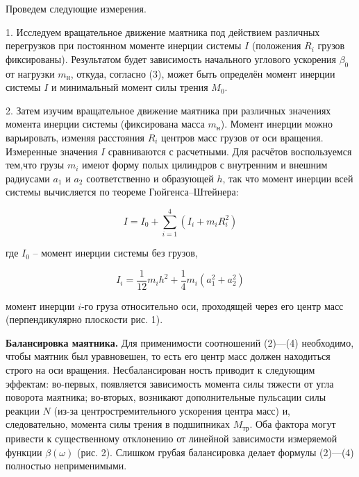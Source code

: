 \documentclass[14pt]{article}
\begin{document}
\vspace{1cm}
Проведем следующие измерения.

\vspace{0.5cm}
1. Исследуем вращательное движение маятника под действием различных перегрузков при постоянном моменте инерции системы $I$ (положения $R_i$ грузов фиксированы). Результатом будет зависимость начального углового ускорения $\beta_0$ от нагрузки $m_\text{н}$, откуда, согласно
(3), может быть определён момент инерции системы $I$ и минимальный момент силы трения $M_0$.

2. Затем изучим вращательное движение маятника при различных значениях момента инерции системы (фиксирована масса $m_\text{н}$). Момент инерции можно варьировать, изменяя расстояния $R_i$ центров масс грузов от оси вращения. Измеренные значения $I$ сравниваются с расчетными. Для расчётов воспользуемся тем,что грузы $m_i$ имеют форму полых цилиндров с внутренним и внешним радиусами $a_1$ и $a_2$ соответственно и образующей $h$, так что момент инерции всей системы вычисляется по теореме Гюйгенса–Штейнера:

\begin{equation}
I = I_0 + \sum_{i = 1}^4(I_i + m_iR_i^2)
\end{equation}

где $I_0$ – момент инерции системы без грузов,

\begin{equation}
I_i = \frac{1}{12}m_ih^2 + \frac{1}{4}m_i(a_1^2 + a_2^2)
\end{equation}

момент инерции $i$-го груза относительно оси, проходящей через его центр масс (перпендикулярно плоскости рис. 1). 

\vspace{1cm}
\textbf{Балансировка маятника.}
Для применимости соотношений (2)---(4) необходимо, чтобы маятник был уравновешен, то есть его центр масс должен находиться строго на оси вращения. Несбалансирован ность приводит к следующим эффектам: во-первых, появляется зависимость момента силы тяжести от угла поворота маятника; во-вторых, возникают дополнительные пульсации силы реакции $N$ (из-за центростремительного ускорения центра масс) и, следовательно, момента силы трения в подшипниках $M_\text{тр}$. Оба фактора могут привести к существенному отклонению от линейной зависимости измеряемой функции $\beta(\omega)$ (рис. 2). Слишком грубая балансировка делает формулы (2)---(4) полностью неприменимыми.
\end{document}
